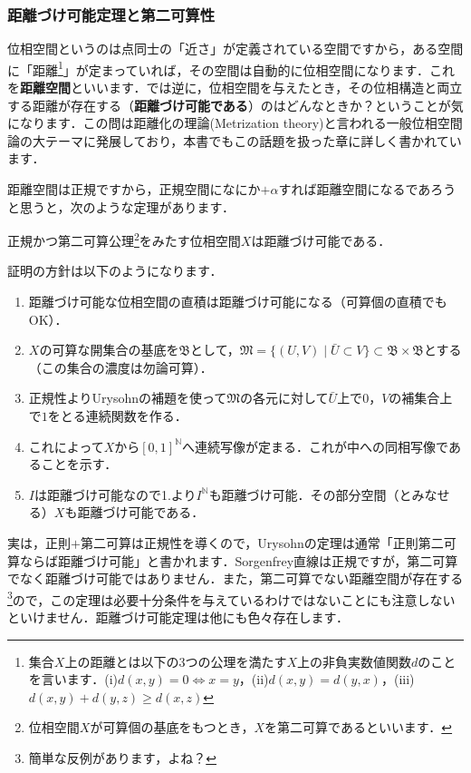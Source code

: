 \subsubsection*{距離づけ可能定理と第二可算性}
位相空間というのは点同士の「近さ」が定義されている空間ですから，ある空間に「距離\footnote{集合$X$上の距離とは以下の3つの公理を満たす$X$上の非負実数値関数$d$のことを言います．(i)$d(x,y)=0\Leftrightarrow x=y$，(ii)$d(x,y)=d(y,x)$，(iii)$d(x,y)+d(y,z)\geq d(x,z)$}」が定まっていれば，その空間は自動的に位相空間になります．これを{\bf 距離空間}といいます．では逆に，位相空間を与えたとき，その位相構造と両立する距離が存在する（{\bf 距離づけ可能である}）のはどんなときか？ということが気になります．この問は距離化の理論(Metrization theory)と言われる一般位相空間論の大テーマに発展しており，本書でもこの話題を扱った章に詳しく書かれています．\par
距離空間は正規ですから，正規空間になにか$+\alpha$すれば距離空間になるであろうと思うと，次のような定理があります．
\begin{thmm}[Urysohnの定理]
正規かつ第二可算公理\footnote{位相空間$X$が可算個の基底をもつとき，$X$を第二可算であるといいます．}をみたす位相空間$X$は距離づけ可能である．
\end{thmm}
証明の方針は以下のようになります．
\begin{enumerate}
\item 距離づけ可能な位相空間の直積は距離づけ可能になる（可算個の直積でもOK）．
\item $X$の可算な開集合の基底を$\mathfrak{B}$として，$\mathfrak{M}=\{(U,V)\mid \bar{U}\subset V \}\subset \mathfrak{B}\times\mathfrak{B}$とする（この集合の濃度は勿論可算）．
\item 正規性よりUrysohnの補題を使って$\mathfrak{M}$の各元に対して$\bar{U}$上で$0$，$V$の補集合上で$1$をとる連続関数を作る．
\item これによって$X$から$[0,1]^\mathbb{N}$へ連続写像が定まる．これが中への同相写像であることを示す．
\item $I$は距離づけ可能なので1.より$I^\mathbb{N}$も距離づけ可能．その部分空間（とみなせる）$X$も距離づけ可能である．
\end{enumerate}
実は，正則$+$第二可算は正規性を導くので，Urysohnの定理は通常「正則第二可算ならば距離づけ可能」と書かれます．Sorgenfrey直線は正規ですが，第二可算でなく距離づけ可能ではありません．また，第二可算でない距離空間が存在する\footnote{簡単な反例があります，よね？}ので，この定理は必要十分条件を与えているわけではないことにも注意しないといけません．距離づけ可能定理は他にも色々存在します．\par
